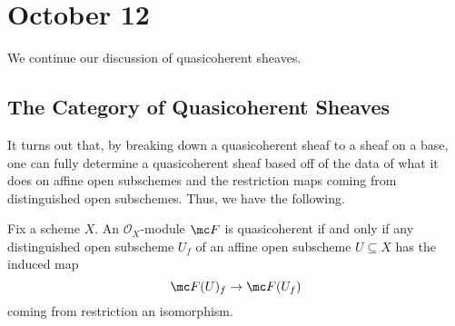 \documentclass[../notes.tex]{subfiles}
\begin{document}
\section{October 12}

We continue our discussion of quasicoherent sheaves.

\subsection{The Category of Quasicoherent Sheaves}
It turns out that, by breaking down a quasicoherent sheaf to a sheaf on a base, one can fully determine a quasicoherent sheaf based off of the data of what it does on affine open subschemes and the restriction maps coming from distinguished open subschemes. Thus, we have the following.
\begin{lemma} \label{lem:localize-is-good}
	Fix a scheme $X$. An $\mathcal O_X$-module $\mc F$ is quasicoherent if and only if any distinguished open subscheme $U_f$ of an affine open subscheme $U\subseteq X$ has the induced map
	\[\mc F(U)_f\to\mc F(U_f)\]
	coming from restriction an isomorphism.
\end{lemma}
\end{document}
